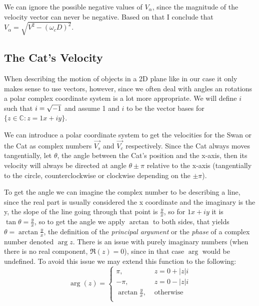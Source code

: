 \documentclass[12pt]{article}
\begin{document}
We can ignore the possible negative values of $V_\alpha$, since the magnitude of the velocity vector can never be negative. Based on that I conclude that $V_\alpha = \sqrt{V^2 - (\omega_c D)^2}$.

\subsection{The Cat's Velocity}

When describing the motion of objects in a 2D plane like in our case it only makes sense to use vectors, however, since we often deal with angles an rotations a polar complex coordinate system is a lot more appropriate. We will define $i$ such that $i = \sqrtsign{-1}$ and assume 1 and $i$ to be the vector bases for $\{z \in \mathbb{C}: z = 1x + iy\}$.


We can introduce a polar coordinate system to get the velocities for the Swan or the Cat as complex numbers $\vec{V_s}$ and $\vec{V_c}$ respectively. Since the Cat always moves tangentially, let $\theta$, the angle between the Cat's position and the x-axis, then its velocity will always be directed at angle $\theta \pm \pi$ relative to the x-axis (tangentially to the circle, counterclockwise or clockwise depending on the $\pm \pi$).

To get the angle we can imagine the complex number to be describing a line, since the real part is usually considered the x coordinate and the imaginary is the y, the slope of the line going through that point is $\frac{y}{x}$, so for $1x + iy$ it is $\tan \theta = \frac{y}{x}$, so to get the angle we apply $\arctan$ to both sides, that yields $\theta = \arctan{\frac{y}{x}}$, the definition of the \textit{principal argument}\citep{princarg} or the \textit{phase} of a complex number denoted $\arg z$. There is an issue with purely imaginary numbers (when there is no real component, $\Re (z) = 0$), since in that case $\arg$ would be undefined. To avoid this issue we may extend this function to the following: \begin{equation}
\arg (z) = \left\{ 
		\begin{aligned}
			\pi						,\hspace{4pt}&  z = 0 + |z|i\\
			-\pi					,\hspace{4pt}&  z = 0 - |z|i\\
			\arctan {\frac{y}{x}}	,\hspace{4pt}&	\text{otherwise}\\
		\end{aligned}
\right.\end{equation}
\end{document}
